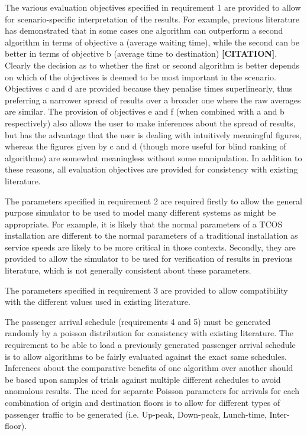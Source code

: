\documentclass{UoYCSproject}
\begin{document}
The various evaluation objectives specified in requirement 1 are provided to allow for scenario-specific interpretation of the results.  For example, previous literature has demonstrated that in some cases one algorithm can outperform a second algorithm in terms of objective a (average waiting time), while the second can be better in terms of objective b (average time to destination) \textbf{[CITATION]}.  Clearly the decision as to whether the first or second algorithm is better depends on which of the objectives is deemed to be most important in the scenario.  Objectives c and d are provided because they penalise times superlinearly, thus preferring a narrower spread of results over a broader one where the raw averages are similar.  The provision of objectives e and f (when combined with a and b respectively) also allows the user to make inferences about the spread of results, but has the advantage that the user is dealing with intuitively meaningful figures, whereas the figures given by c and d (though more useful for blind ranking of algorithms) are somewhat meaningless without some manipulation.  In addition to these reasons, all evaluation objectives are provided for consistency with existing literature.

The parameters specified in requirement 2 are required firstly to allow the general purpose simulator to be used to model many different systems as might be appropriate.  For example, it is likely that the normal parameters of a TCOS installation are different to the normal parameters of a traditional installation as service speeds are likely to be more critical in those contexts.  Secondly, they are provided to allow the simulator to be used for verification of results in previous literature, which is not generally consistent about these parameters.

The parameters specified in requirement 3 are provided to allow compatibility with the different values used in existing literature.

The passenger arrival schedule (requirements 4 and 5) must be generated randomly by a poisson distribution for consistency with existing literature.  The requirement to be able to load a previously generated passenger arrival schedule is to allow algorithms to be fairly evaluated against the exact same schedules.  Inferences about the comparative benefits of one algorithm over another should be based upon samples of trials against multiple different schedules to avoid anomalous results.  The need for separate Poisson parameters for arrivals for each combination of origin and destination floors is to allow for different types of passenger traffic to be generated (i.e. Up-peak, Down-peak, Lunch-time, Inter-floor).
\end{document}
